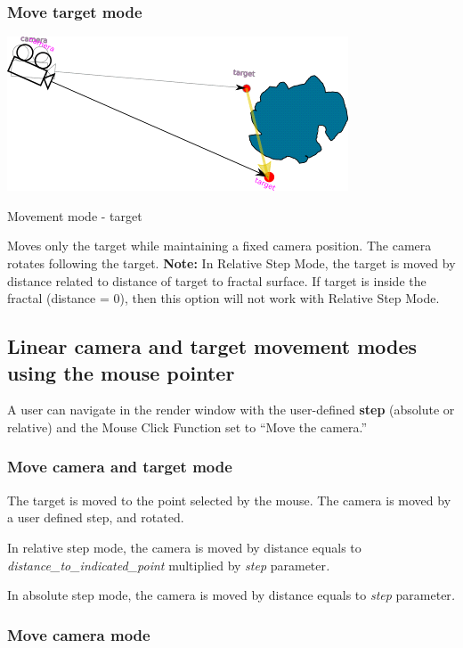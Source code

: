 \subsubsection{Move target mode}\label{move-target-mode}

\includegraphics[width=3.98819in,height=1.80208in]{img/manual/media/image13.png}

Movement mode - target

Moves only the target while maintaining a fixed camera position. The
camera rotates following the target. \textbf{Note:} In Relative Step
Mode, the target is moved by distance related to distance of target to
fractal surface. If target is inside the fractal (distance = 0), then
this option will not work with Relative Step Mode.

\subsection{Linear camera and target movement modes using the mouse
pointer}\label{linear-camera-and-target-movement-modes-using-the-mouse-pointer}

A user can navigate in the render window with the user-defined
\textbf{step} (absolute or relative) and the Mouse Click Function set to
``Move the camera.''

\subsubsection{Move camera and target
mode}\label{move-camera-and-target-mode-1}

The target is moved to the point selected by the mouse. The camera is
moved by a user defined step, and rotated.

In relative step mode, the camera is moved by distance equals to
\emph{distance\_to\_indicated\_point} multiplied by \emph{step}
parameter\emph{.}

In absolute step mode, the camera is moved by distance equals to
\emph{step} parameter\emph{.}

\subsubsection{Move camera mode}\label{move-camera-mode-1}

